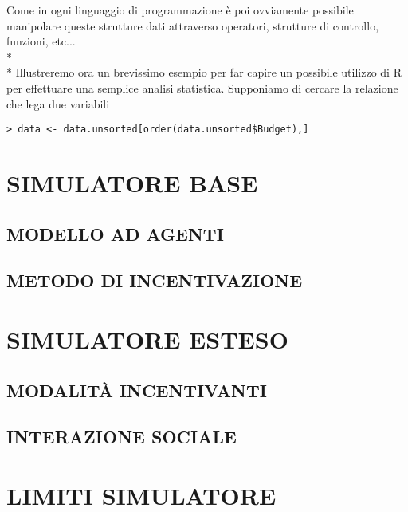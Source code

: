 \documentclass[12pt,a4paper,openright,twoside]{report}
\begin{document}
Come in ogni linguaggio di programmazione è poi ovviamente possibile manipolare queste strutture dati attraverso operatori, strutture di controllo, funzioni, etc...\\* \\*
Illustreremo ora un brevissimo esempio per far capire un possibile utilizzo di R per effettuare una semplice analisi statistica. Supponiamo di cercare la relazione che lega due variabili 

\lstset{language=Prolog,basicstyle=\footnotesize}
\begin{lstlisting}
> data <- data.unsorted[order(data.unsorted$Budget),]
\end{lstlisting}

\section{SIMULATORE BASE}

\subsection{MODELLO AD AGENTI}

\subsection{METODO DI INCENTIVAZIONE}


\section{SIMULATORE ESTESO}

\subsection{MODALITÀ INCENTIVANTI}

\subsection{INTERAZIONE SOCIALE}


\section{LIMITI SIMULATORE}
\end{document}
